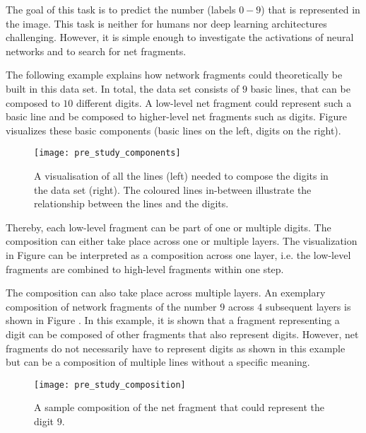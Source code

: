 The goal of this task is to predict the number (labels $0-9$) that is represented in the image.
This task is neither for humans nor deep learning architectures challenging.
However, it is simple enough to investigate the activations of neural networks and to search for net fragments.

The following example explains how network fragments could theoretically be built in this data set.
In total, the data set consists of $9$ basic lines, that can be composed to $10$ different digits.
A low-level net fragment could represent such a basic line and be composed to higher-level net fragments such as digits.
Figure  visualizes these basic components (basic lines on the left, digits on the right).

\begin{figure}[h]
    \centering
    \texttt{[image: pre\_study\_components]}
    \caption[Line Types in Straight Line Digits Dataset]{A visualisation of all the lines (left) needed to compose the digits in the data set (right). The coloured lines in-between illustrate the relationship between the lines and the digits.}
\end{figure}

Thereby, each low-level fragment can be part of one or multiple digits.
The composition can either take place across one or multiple layers.
The visualization in Figure  can be interpreted as a composition across one layer, i.e. the low-level fragments are combined to high-level fragments within one step.

The composition can also take place across multiple layers. 
An exemplary composition of network fragments of the number $9$ across $4$ subsequent layers is shown in Figure .
In this example, it is shown that a fragment representing a digit can be composed of other fragments that also represent digits.
However, net fragments do not necessarily have to represent digits as shown in this example but can be a composition of multiple lines without a specific meaning.

\begin{figure}[h]
    \centering
    \texttt{[image: pre\_study\_composition]}
    \caption[Sample Net Fragment Composition]{A sample composition of the net fragment that could represent the digit $9$.}
\end{figure}

